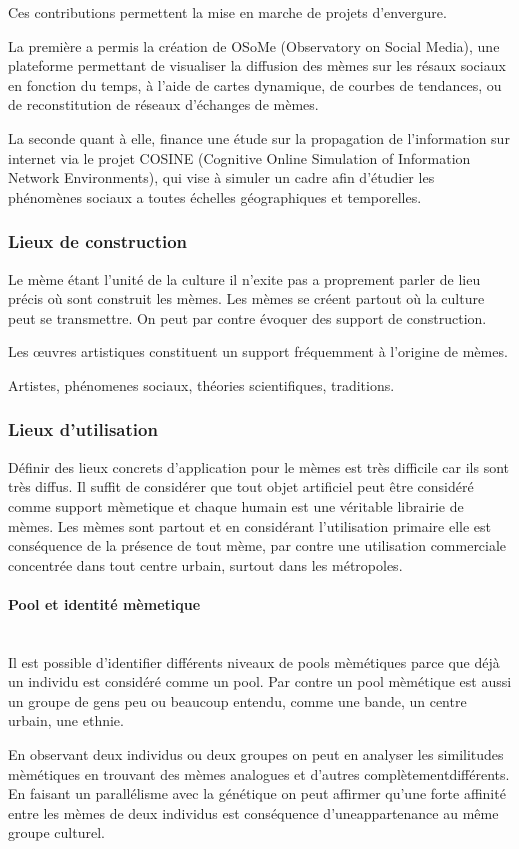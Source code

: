 \documentclass[12pt]{article}
\newcommand{\myparagraph}[1]{\paragraph{#1}\mbox{}\\}
\begin{document}
Ces contributions permettent la mise en marche de projets d'envergure.

La première a permis la création de OSoMe (Observatory on Social Media),
une plateforme permettant de visualiser la diffusion des mèmes sur les
résaux sociaux en fonction du temps, à l'aide de cartes dynamique, de
courbes de tendances, ou de reconstitution de réseaux d'échanges de
mèmes.

La seconde quant à elle, finance une étude sur la propagation de
l'information sur internet via le projet COSINE (Cognitive Online
Simulation of Information Network Environments), qui vise à simuler un
cadre afin d'étudier les phénomènes sociaux a toutes échelles
géographiques et temporelles.


\subsubsection{Lieux de construction}
Le mème étant l'unité de la culture il n'exite pas a proprement parler
de lieu précis où sont construit les mèmes. Les mèmes se créent partout
où la culture peut se transmettre. On peut par contre évoquer des
support de construction.

Les œuvres artistiques constituent un support fréquemment à l'origine de
mèmes.

Artistes, phénomenes sociaux, théories scientifiques, traditions.


\subsubsection{Lieux d'utilisation}
Définir des lieux concrets d'application pour le mèmes est très
difficile car ils sont très diffus. Il suffit de considérer que tout
objet artificiel peut être considéré comme support mèmetique et chaque
humain est une véritable librairie de mèmes. Les mèmes sont partout et
en considérant l'utilisation primaire elle est conséquence de la
présence de tout mème, par contre une utilisation commerciale concentrée
dans tout centre urbain, surtout dans les métropoles.

\myparagraph{Pool et identité mèmetique}
Il est possible d'identifier différents niveaux de pools mèmétiques
parce que déjà un individu est considéré comme un pool. Par contre un
pool mèmétique est aussi un groupe de gens peu ou beaucoup entendu,
comme une bande, un centre urbain, une ethnie. \cite{imitation}

En observant deux individus ou deux groupes on peut en analyser les
similitudes mèmétiques en trouvant des mèmes analogues et d'autres
complètementdifférents. En faisant un parallélisme avec la génétique on
peut affirmer qu'une forte affinité entre les mèmes de deux individus
est conséquence d'uneappartenance au même groupe culturel.
\end{document}
